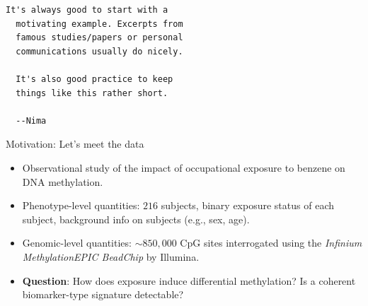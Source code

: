 \documentclass[12pt,t]{beamer}
\begin{document}

\begin{frame}[fragile,c]{}

\begin{center}
\begin{minipage}[c]{9.3cm}
\begin{semiverbatim}
\lstset{basicstyle=\normalsize}
\begin{lstlisting}[linewidth=9.3cm]
  It's always good to start with a
  motivating example. Excerpts from
  famous studies/papers or personal
  communications usually do nicely.

  It's also good practice to keep
  things like this rather short.

  --Nima
\end{lstlisting}
\end{semiverbatim}
\end{minipage}
\end{center}


\end{frame}


\begin{frame}[c]{Motivation: Let's meet the data}

\begin{center}
\begin{itemize}
  \itemsep12pt
  \item Observational study of the impact of occupational exposure to benzene on
    DNA methylation.
  \item Phenotype-level quantities: $216$ subjects, binary exposure status of
    each subject, background info on subjects (e.g., sex, age).
  \item Genomic-level quantities: $\sim 850,000$ CpG sites interrogated using
    the \textit{Infinium MethylationEPIC BeadChip} by Illumina.
  \item \textbf{Question}: How does exposure induce differential methylation? Is
    a coherent biomarker-type signature detectable?
\end{itemize}
\end{center}


\end{frame}
\end{document}
